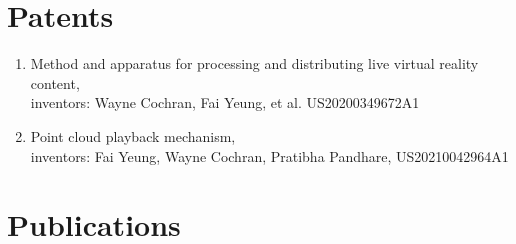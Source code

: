 \documentclass[10pt]{article}
\begin{document}
%


\section*{Patents}

\begin{enumerate}
\item Method and apparatus for processing and distributing live virtual reality content,\\
   inventors: Wayne Cochran, Fai Yeung, et al.
   US20200349672A1
\item Point cloud playback mechanism,\\
   inventors: Fai Yeung, Wayne Cochran, Pratibha Pandhare,
   US20210042964A1
\end{enumerate}

\section*{Publications}
\end{document}
